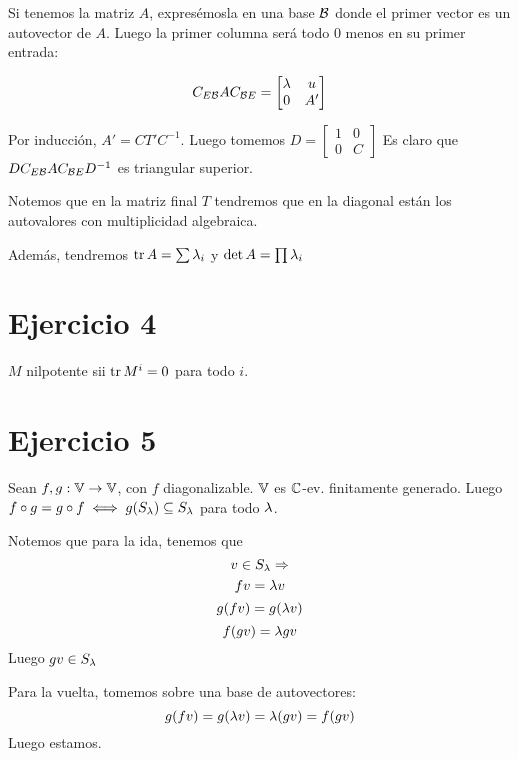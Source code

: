 \documentclass{article}
\begin{document}
Si tenemos la matriz $A$, expresémosla en una base $\mathcal{B}$ donde el primer vector es un autovector de $A$. Luego la primer columna será todo $0$ menos en su primer entrada:

\[C_{E\mathcal{B}}AC_{\mathcal{B} E} = 
\begin{bmatrix}
	\lambda & u \\
	0 & A'
\end{bmatrix}\]

Por inducción, $A' = CT'C^{-1}$. Luego tomemos $D =
\begin{bmatrix}
	1 & 0 \\
	0 & C
\end{bmatrix}$
Es claro que $DC_{E\mathcal{B}}AC_{\mathcal{B} E}D^{-1}$ es triangular superior.

Notemos que en la matriz final $T$ tendremos que en la diagonal están los autovalores con multiplicidad algebraica.

Además, tendremos $\operatorname{tr} A = \sum \lambda_i$ y $\det A = \prod \lambda_i$

\section*{Ejercicio 4}
$M$ nilpotente sii $\operatorname{tr} M^i = 0$ para todo $i$.

\section*{Ejercicio 5}
Sean $f, g: \mathbb{V} \to \mathbb{V}$, con $f$ diagonalizable. $\mathbb{V}$ es $\mathbb{C}$-ev. finitamente generado. Luego $f \circ g = g \circ f \iff g(S_\lambda) \subseteq S_\lambda$ para todo $\lambda$.

Notemos que para la ida, tenemos que
\[v \in S_\lambda \Rightarrow\]
\[fv = \lambda v\]
\[g(fv) = g(\lambda v)\]
\[f(gv) = \lambda gv\]
Luego $gv \in S_\lambda$

Para la vuelta, tomemos sobre una base de autovectores:
\[g(fv) = g(\lambda v) = \lambda (gv) = f(gv)\]
Luego estamos.
\end{document}
